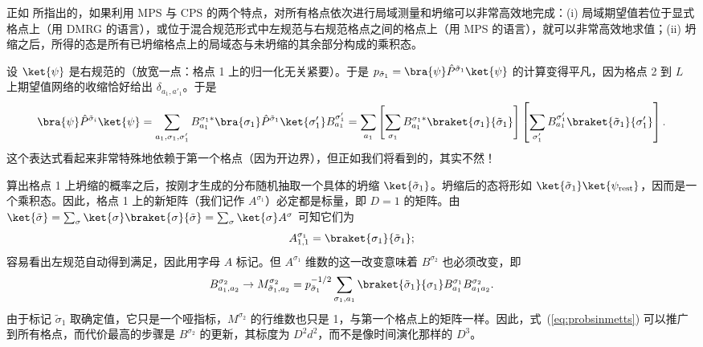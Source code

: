 正如 \cite{Stoudenmire10} 所指出的，如果利用 MPS 与 CPS 的两个特点，对所有格点依次进行局域测量和坍缩可以非常高效地完成：(i) 局域期望值若位于显式格点上（用 DMRG 的语言），或位于混合规范形式中左规范与右规范格点之间的格点上（用 MPS 的语言），就可以非常高效地求值；(ii) 坍缩之后，所得的态是所有已坍缩格点上的局域态与未坍缩的其余部分构成的乘积态。

设 $\ket{\psi}$ 是右规范的（放宽一点：格点 1 上的归一化无关紧要）。于是 $p_{\tilde{\sigma}_1} =\bra{\psi} \hat{P}^{\tilde{\sigma}_1} \ket{\psi}$ 的计算变得平凡，因为格点 2 到 $L$ 上期望值网络的收缩恰好给出 $\delta_{a_1,a'_1}$。于是
\begin{equation}
\bra{\psi} \hat{P}^{\tilde{\sigma}_i} \ket{\psi} = \sum_{a_1,\sigma_1,\sigma'_1} B^{\sigma_1 *}_{a_1} \bra{\sigma_1} \hat{P}^{\tilde{\sigma}_1} \ket{\sigma'_1} B^{\sigma'_1}_{a_1} = 
\sum_{a_1} \left[ \sum_{\sigma_1} B^{\sigma_1*}_{a_1} \braket{\sigma_1}{\tilde{\sigma}_1} \right]
\left[ \sum_{\sigma'_1} B^{\sigma'_1}_{a_1} \braket{\tilde{\sigma}_1}{\sigma'_1} \right] .
\label{eq:probsinmetts}
\end{equation}
这个表达式看起来非常特殊地依赖于第一个格点（因为开边界），但正如我们将看到的，其实不然！

算出格点 1 上坍缩的概率之后，按刚才生成的分布随机抽取一个具体的坍缩 $\ket{\tilde{\sigma}_1}$。坍缩后的态将形如 $\ket{\tilde{\sigma}_1} \ket{\psi_{{\rm rest}}}$，因而是一个乘积态。因此，格点 1 上的新矩阵（我们记作 $A^{\sigma_1}$）必定都是标量，即 $D=1$ 的矩阵。由
$\ket{\tilde{\sigma}} = \sum_{\sigma} \ket{\sigma} \braket{\sigma}{\tilde{\sigma}} = \sum_\sigma \ket{\sigma} A^{\sigma}$ 可知它们为
\begin{equation}
A^{\sigma_1}_{1,1} = \braket{\sigma_1}{\tilde{\sigma}_1} ;
\end{equation}
容易看出左规范自动得到满足，因此用字母 $A$ 标记。但 $A^{\sigma_1}$ 维数的这一改变意味着 $B^{\sigma_2}$ 也必须改变，即
\begin{equation}
B^{\sigma_2}_{a_1,a_2} \rightarrow M^{\sigma_2}_{\tilde{\sigma}_1,a_2} =
p_{\tilde{\sigma}_1}^{-1/2} \sum_{\sigma_1,a_1} \braket{\tilde{\sigma}_1}{\sigma_1} B^{\sigma_1}_{a_1} B^{\sigma_2}_{a_1 a_2} .
\end{equation}
由于标记 $\tilde{\sigma}_1$ 取确定值，它只是一个哑指标，$M^{\sigma_2}$ 的行维数也只是 1，与第一个格点上的矩阵一样。因此，式~(\ref{eq:probsinmetts}) 可以推广到所有格点，而代价最高的步骤是 $B^{\sigma_2}$ 的更新，其标度为 $D^2 d^2$，而不是像时间演化那样的 $D^3$。

